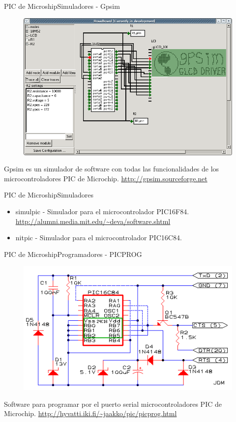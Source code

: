 \documentclass{beamer}
\begin{document}
\begin{frame}{PIC de Microship}{Simuladores - Gpsim}
  \begin{figure}[!h]
    \centering
    \includegraphics[scale=0.2]{img/gpsim.png}
  \end{figure}
  Gpsim es un simulador de software con todas las funcionalidades de los microcontroladores PIC de Microchip. \url{http://gpsim.sourceforge.net}
\end{frame}

\begin{frame}{PIC de Microship}{Simuladores}
  \begin{itemize}
  \item simulpic - Simulador para el microcontrolador PIC16F84. \url{http://alumni.media.mit.edu/~deva/software.shtml}
  \item nitpic - Simulador para el microcontrolador PIC16C84.
  \end{itemize}
\end{frame}

\begin{frame}{PIC de Microship}{Programadores - PICPROG}
    \begin{figure}[!h]
    \centering
    \includegraphics[scale=0.4]{img/picprog.png}
  \end{figure}
  Software para programar por el puerto serial microcontroladores PIC de Microchip. \url{http://hyvatti.iki.fi/~jaakko/pic/picprog.html}
\end{frame}
\end{document}
